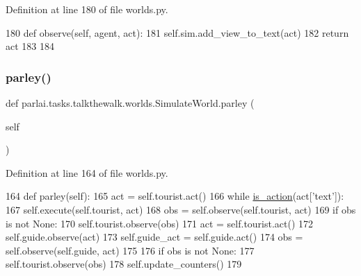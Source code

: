 Definition at line 180 of file worlds.\+py.


\begin{DoxyCode}
180     \textcolor{keyword}{def }observe(self, agent, act):
181         self.sim.add\_view\_to\_text(act)
182         \textcolor{keywordflow}{return} act
183 
184 
\end{DoxyCode}
\mbox{\label{classparlai_1_1tasks_1_1talkthewalk_1_1worlds_1_1SimulateWorld_a6bd5a8a8e194dd4aa76aeecdf429bc7f}} 
\subsubsection{\texorpdfstring{parley()}{parley()}}
{\footnotesize\ttfamily def parlai.\+tasks.\+talkthewalk.\+worlds.\+Simulate\+World.\+parley (\begin{DoxyParamCaption}\item[{}]{self }\end{DoxyParamCaption})}



Definition at line 164 of file worlds.\+py.


\begin{DoxyCode}
164     \textcolor{keyword}{def }parley(self):
165         act = self.tourist.act()
166         \textcolor{keywordflow}{while} \hyperlink{namespaceparlai_1_1tasks_1_1talkthewalk_1_1worlds_aa28536df060005c301225d766f91cb13}{is\_action}(act[\textcolor{stringliteral}{'text'}]):
167             self.execute(self.tourist, act)
168             obs = self.observe(self.tourist, act)
169             \textcolor{keywordflow}{if} obs \textcolor{keywordflow}{is} \textcolor{keywordflow}{not} \textcolor{keywordtype}{None}:
170                 self.tourist.observe(obs)
171             act = self.tourist.act()
172         self.guide.observe(act)
173         self.guide\_act = self.guide.act()
174         obs = self.observe(self.guide, act)
175 
176         \textcolor{keywordflow}{if} obs \textcolor{keywordflow}{is} \textcolor{keywordflow}{not} \textcolor{keywordtype}{None}:
177             self.tourist.observe(obs)
178         self.update\_counters()
179 
\end{DoxyCode}
\mbox{\label{classparlai_1_1tasks_1_1talkthewalk_1_1worlds_1_1SimulateWorld_aaf801dc51b7f37b6fb9629194ca4b2ee}} 

